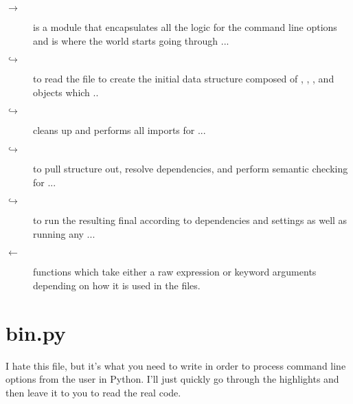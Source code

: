 \begin{description}
\item[$\rightarrow$]  is a module that encapsulates all the
    logic for the command line options and is where the world starts going
    through ...
\item[$\hookrightarrow$] to read the 
    file to create the initial data structure composed of ,
     , , and  objects which ..
\item[$\hookrightarrow$] cleans up and performs all
    imports for ...
\item[$\hookrightarrow$] to pull structure out, resolve
    dependencies, and perform semantic checking for ...
\item[$\hookrightarrow$] to run the resulting final
     according to dependencies and  settings
    as well as running any ...
\item[$\leftarrow$] functions which take either a raw 
    expression or keyword arguments depending
    on how it is used in the  files.
\end{description}



\section{bin.py}

I hate this file, but it's what you need to write in order to process command
line options from the user in Python.  I'll just quickly go through the
highlights and then leave it to you to read the real code.


